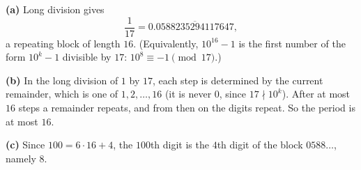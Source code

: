 \textbf{(a)} Long division gives
\[\dfrac{1}{17}=0.\overline{0588235294117647},\]
a repeating block of length $\boxed{16}$. (Equivalently, $10^{16}-1$ is the first number of the form $10^k-1$ divisible by $17$: $10^8\equiv-1\pmod{17}$.)

\textbf{(b)} In the long division of $1$ by $17$, each step is determined by the current remainder, which is one of $1,2,\ldots,16$ (it is never $0$, since $17\nmid10^k$). After at most $16$ steps a remainder repeats, and from then on the digits repeat. So the period is at most $16$.

\textbf{(c)} Since $100=6\cdot16+4$, the $100$th digit is the $4$th digit of the block $0588\ldots$, namely $\boxed{8}$.
